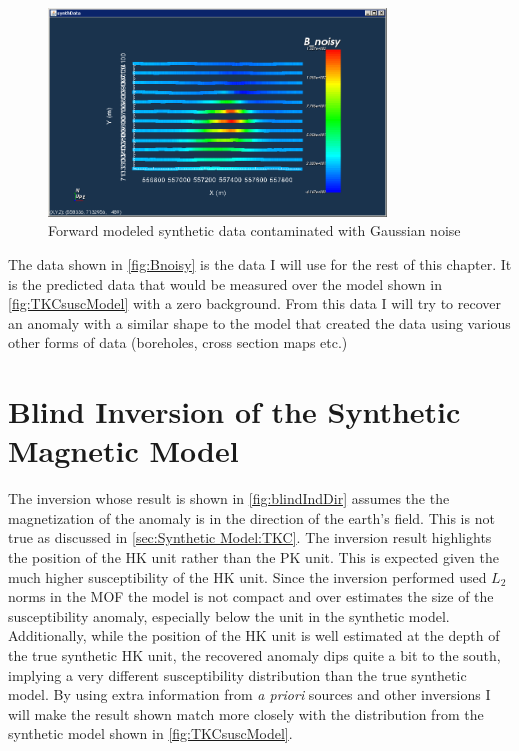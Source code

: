 \begin{figure} [h]
   \centering
   \includegraphics[width=0.8\textwidth]{images/TKC/Bnoisy.PNG}
   \caption{Forward modeled synthetic data contaminated with Gaussian noise}
   \label{fig:Bnoisy}
\end{figure}

The data shown in \autoref{fig:Bnoisy} is the data I will use for the rest of this chapter. It is the predicted data that would be measured over the model shown in \autoref{fig:TKCsuscModel} with a zero background. From this data I will try to recover an anomaly with a similar shape to the model that created the data using various other forms of data (boreholes, cross section maps etc.)


\FloatBarrier
\section{Blind Inversion of the Synthetic Magnetic Model}
\label{sec:Blind Inversion of the Synthetic Model:TKC}

The inversion whose result is shown in \autoref{fig:blindIndDir} assumes the the magnetization of the anomaly is in the direction of the earth's field. This is not true as discussed in \autoref{sec:Synthetic Model:TKC}. The inversion result highlights the position of the HK unit rather than the PK unit. This is expected given the much higher susceptibility of the HK unit. Since the inversion performed used $L_2$ norms in the \ac{MOF} the model is not compact and over estimates the size of the susceptibility anomaly, especially below the unit in the synthetic model. Additionally, while the position of the HK unit is well estimated at the depth of the true synthetic HK unit, the recovered anomaly dips quite a bit to the south, implying a very different susceptibility distribution than the true synthetic model. By using extra information from \emph{a priori} sources and other inversions I will make the result shown match more closely with the distribution from the synthetic model shown in \autoref{fig:TKCsuscModel}.

